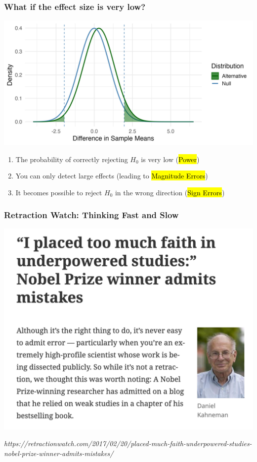 \documentclass[slidestop,compress,mathserif]{beamer}
\newcommand{\soln}[1]{\textit{#1}}
\begin{document}
\begin{frame}
\frametitle{What if the effect size is very low?}
  \begin{center}
      \includegraphics[width=\textwidth]{../Lecture27/figures/whatif_lowpower.png}
  \end{center}
  \small{
  \begin{enumerate}
	\item The probability of correctly rejecting $H_0$ is very low (\hl{Power})
	\item You can only detect large effects (leading to \hl{Magnitude Errors})
	\item It becomes possible to reject $H_0$ in the wrong direction (\hl{Sign Errors})
  \end{enumerate}
  }
\end{frame}


\begin{frame}
	\frametitle{Retraction Watch: Thinking Fast and Slow}
	\begin{center}
		\includegraphics[height=0.75\textheight]{figures/Kahneman.png}
	\end{center}
	\soln{\footnotesize https://retractionwatch.com/2017/02/20/placed-much-faith-underpowered-studies-nobel-prize-winner-admits-mistakes/}
\end{frame}
\end{document}
